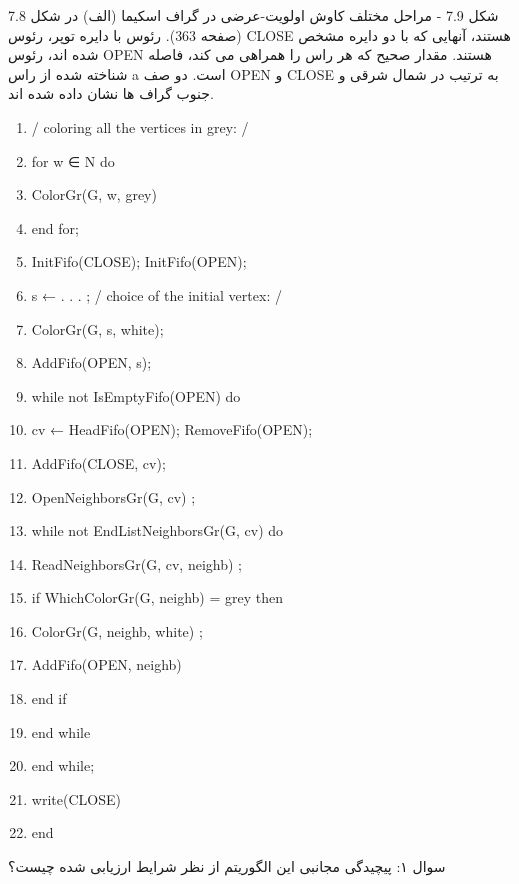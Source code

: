 \documentclass{book} %
\begin{document}
شکل 7.9 - مراحل مختلف کاوش اولویت-عرضی در گراف اسکیما (الف) در شکل 7.8 (صفحه 363). رئوس با دایره توپر، رئوس CLOSE هستند، آنهایی که با دو دایره مشخص شده اند، رئوس OPEN هستند. مقدار صحیح که هر راس را همراهی می کند، فاصله شناخته شده از راس a است. دو صف OPEN و CLOSE به ترتیب در شمال شرقی و جنوب گراف ها نشان داده شده اند.

\begin{latin}
    
    \begin{enumerate}
        
        \item / coloring all the vertices in grey: /
        \item for w ∈ N do
        \item   ColorGr(G, w, grey)
        \item end for;
        \item InitFifo(CLOSE); InitFifo(OPEN);
        \item s ← . . . ; / choice of the initial vertex: /
        \item ColorGr(G, s, white);
        \item AddFifo(OPEN, s);
        \item while not IsEmptyFifo(OPEN) do
        \item   cv ← HeadFifo(OPEN); RemoveFifo(OPEN);
        \item   AddFifo(CLOSE, cv);
        \item   OpenNeighborsGr(G, cv) ;
        \item   while not EndListNeighborsGr(G, cv) do
        \item   ReadNeighborsGr(G, cv, neighb) ;
        \item   if WhichColorGr(G, neighb) = grey then
        \item       ColorGr(G, neighb, white) ;
        \item       AddFifo(OPEN, neighb)
        \item   end if
        \item end while
        \item end while;
        \item write(CLOSE) 
        \item end
        
        
    \end{enumerate}
    
\end{latin}

سوال ۱: پیچیدگی مجانبی این الگوریتم از نظر شرایط ارزیابی شده چیست؟
\end{document}
